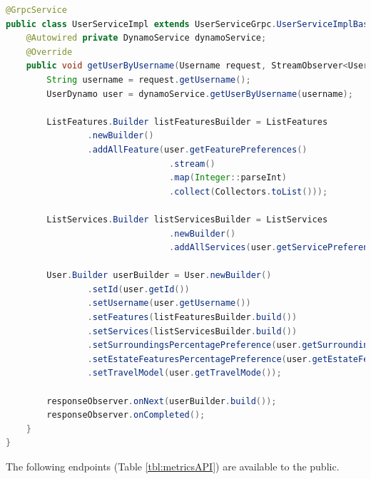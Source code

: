 \begin{lstlisting}[float, language=Java, caption={Service definition}, captionpos=t]
@GrpcService
public class UserServiceImpl extends UserServiceGrpc.UserServiceImplBase {
    @Autowired private DynamoService dynamoService;
    @Override 
    public void getUserByUsername(Username request, StreamObserver<User> responseObserver){
        String username = request.getUsername();
        UserDynamo user = dynamoService.getUserByUsername(username);

        ListFeatures.Builder listFeaturesBuilder = ListFeatures
                .newBuilder()
                .addAllFeature(user.getFeaturePreferences()
                                .stream()
                                .map(Integer::parseInt)
                                .collect(Collectors.toList()));

        ListServices.Builder listServicesBuilder = ListServices
                                .newBuilder()
                                .addAllServices(user.getServicePreferences());

        User.Builder userBuilder = User.newBuilder()
                .setId(user.getId())
                .setUsername(user.getUsername())
                .setFeatures(listFeaturesBuilder.build())
                .setServices(listServicesBuilder.build())
                .setSurroundingsPercentagePreference(user.getSurroundingsPercentagePreferences())
                .setEstateFeaturesPercentagePreference(user.getEstateFeaturesPercentagePreferences())
                .setTravelModel(user.getTravelMode());

        responseObserver.onNext(userBuilder.build());
        responseObserver.onCompleted();
    }
}
\end{lstlisting}

The following endpoints (Table \ref{tbl:metricsAPI}) are available to the public.


